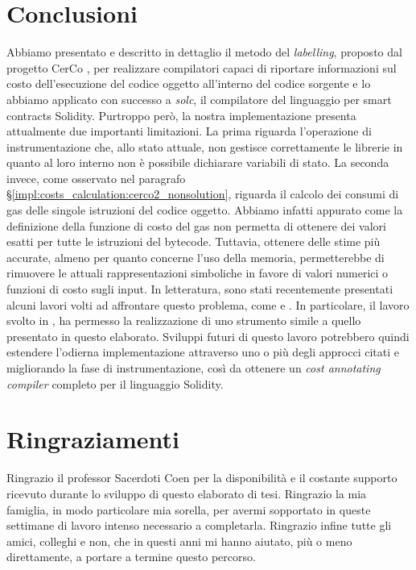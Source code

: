 \documentclass[12pt,a4paper,openright,oneside]{report}
\theoremstyle{definition}
\begin{document}
\clearpage{\pagestyle{empty}\cleardoublepage}

\chapter*{Conclusioni}
Abbiamo presentato e descritto in dettaglio il metodo del \textit{labelling}, proposto dal progetto CerCo \cite{cerco_website}, per realizzare compilatori capaci di riportare informazioni sul costo dell'esecuzione del codice oggetto all'interno del codice sorgente e lo abbiamo applicato con successo a \textit{solc}, il compilatore del linguaggio per smart contracts Solidity. Purtroppo per\`{o}, la nostra implementazione presenta attualmente due importanti limitazioni. La prima riguarda l'operazione di instrumentazione che, allo stato attuale, non gestisce correttamente le librerie in quanto al loro interno non \`{e} possibile dichiarare variabili di stato. La seconda invece, come osservato nel paragrafo \S\ref{impl:costs_calculation:cerco2_nonsolution}, riguarda il calcolo dei consumi di gas delle singole istruzioni del codice oggetto. Abbiamo infatti appurato come la definizione della funzione di costo del gas non permetta di ottenere dei valori esatti per tutte le istruzioni del bytecode. Tuttavia, ottenere delle stime pi\`{u} accurate, almeno per quanto concerne l'uso della memoria, permetterebbe di rimuovere le attuali rappresentazioni simboliche in favore di valori numerici o funzioni di costo sugli input. In letteratura, sono stati recentemente presentati alcuni lavori volti ad affrontare questo problema, come \cite{marescotti} e \cite{gastap}. In particolare, il lavoro svolto in \cite{gastap}, ha permesso la realizzazione di uno strumento simile a quello presentato in questo elaborato. Sviluppi futuri di questo lavoro potrebbero quindi estendere l'odierna implementazione attraverso uno o pi\`{u} degli approcci citati e migliorando la fase di instrumentazione, cos\`{i} da ottenere un \textit{cost annotating compiler} completo per il linguaggio Solidity.



\printbibliography

\clearpage{\pagestyle{empty}\cleardoublepage}
\chapter*{Ringraziamenti}
Ringrazio il professor Sacerdoti Coen per la disponibilit\`{a} e il costante supporto ricevuto durante lo sviluppo di questo elaborato di tesi. Ringrazio la mia famiglia, in modo particolare mia sorella, per avermi sopportato in queste settimane di lavoro intenso necessario a completarla. Ringrazio infine tutte gli amici, colleghi e non, che in questi anni mi hanno aiutato, pi\`{u} o meno direttamente, a portare a termine questo percorso.
\thispagestyle{empty}
\end{document}
